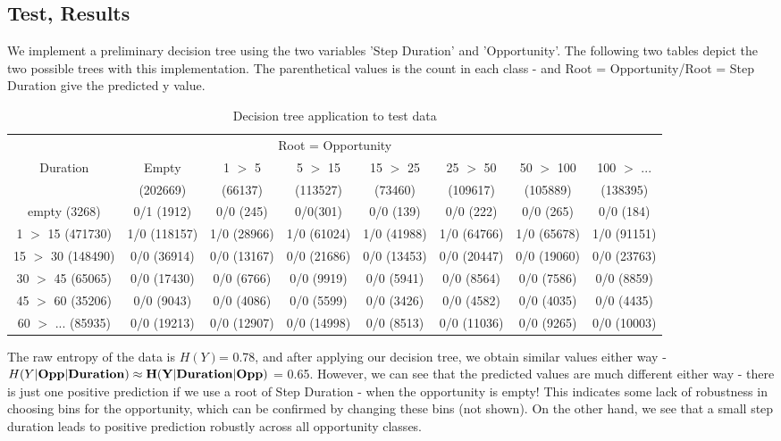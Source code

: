 \documentclass{article} %
\begin{document}
\subsection{Test, Results}
We implement a preliminary decision tree using the two variables 'Step Duration' and 'Opportunity'. The following two tables depict the two possible trees with this implementation. The parenthetical values is the count in each class - and Root = Opportunity/Root = Step Duration give the predicted y value.
\begin{table}[t]
\caption{Decision tree application to test data}
\begin{center}
\begin{tabular}{c|c|c|c|c|c|c|c}
\multicolumn{8}{c}{Root = Opportunity}\\
Duration & Empty & 1 $>$ 5 & 5 $>$ 15 & 15 $>$ 25 & 25 $>$ 50 & 50 $>$ 100 & 100 $>$ ...\\
& (202669) & (66137) & (113527) & (73460) & (109617) & (105889) & (138395)\\
\hline
empty (3268) & 0/1 (1912) & 0/0 (245) & 0/0(301) & 0/0 (139) & 0/0 (222) & 0/0 (265) & 0/0 (184)\\
1 $>$ 15 (471730) & 1/0 (118157) & 1/0  (28966) & 1/0 (61024) & 1/0 (41988) & 1/0 (64766) & 1/0 (65678) & 1/0 (91151)\\
15 $>$ 30 (148490) & 0/0 (36914) & 0/0  (13167) & 0/0 (21686) & 0/0 (13453) & 0/0 (20447) & 0/0 (19060) & 0/0 (23763)\\
30 $>$ 45 (65065) & 0/0 (17430) & 0/0  (6766) & 0/0 (9919) & 0/0 (5941) & 0/0 (8564) & 0/0 (7586) & 0/0 (8859)\\
45 $>$ 60 (35206) & 0/0 (9043) & 0/0 (4086) & 0/0 (5599) & 0/0 (3426) & 0/0 (4582) & 0/0 (4035) & 0/0 (4435)\\
60 $>$ ... (85935) & 0/0 (19213) & 0/0 (12907) & 0/0 (14998) & 0/0 (8513) & 0/0 (11036) & 0/0 (9265) & 0/0 (10003)\\
\end{tabular}
\end{center}
\end{table}

The raw entropy of the data is $H(Y)$= 0.78, and after applying our decision tree, we obtain similar values either way - $H(Y|\bf{Opp}|\bf{Duration}) \approx H(Y|\bf{Duration}|\bf{Opp})$ = 0.65. However, we can see that the predicted values are much different either way - there is just one positive prediction if we use a root of Step Duration - when the opportunity is empty! This indicates some lack of robustness in choosing bins for the opportunity, which can be confirmed by changing these bins (not shown). On the other hand, we see that a small step duration leads to positive prediction robustly across all opportunity classes.
\end{document}
